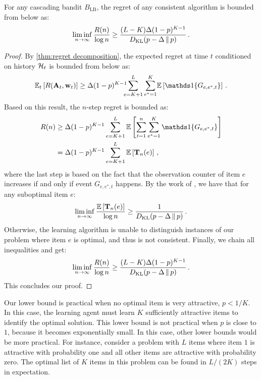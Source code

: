\begin{theorem}
\label{thm:lower bound} For any cascading bandit $B_\mathrm{LB}$, the regret of any consistent algorithm is bounded from below as:
\begin{align*}
  \liminf_{n \to \infty} \frac{R(n)}{\log n} \geq
  \frac{(L - K) \Delta (1 - p)^{K - 1}}{D_\mathrm{KL}(p - \Delta \,\|\, p)}\,.
\end{align*}
\end{theorem}
\begin{proof}
By \cref{thm:regret decomposition}, the expected regret at time $t$ conditioned on history $\mathcal{H}_t$ is bounded from below as:
\begin{align*}
  \EEt{R(\rnd{A}_t, \rnd{w}_t)} \geq
  \Delta (1 - p)^{K - 1} \!\!\!\! \sum_{e = K + 1}^L \sum_{e^\ast = 1}^K \! \EE{\I{G_{e, e^\ast, t}}}\,.
\end{align*}
Based on this result, the $n$-step regret is bounded as:
\begin{align*}
  R(n)
  & \geq \Delta (1 - p)^{K - 1} \sum_{e = K + 1}^L
  \EE{\sum_{t = 1}^n \sum_{e^\ast = 1}^K \I{G_{e, e^\ast, t}}} \\
  & = \Delta (1 - p)^{K - 1} \sum_{e = K + 1}^L \EE{\rnd{T}_n(e)}\,,
\end{align*}
where the last step is based on the fact that the observation counter of item $e$ increases if and only if event $G_{e, e^\ast, t}$ happens. By the work of \citet{lai85asymptotically}, we have that for any suboptimal item $e$:
\begin{align*}
  \liminf_{n \to \infty} \frac{\mathbb{E} \left[\mathbf{T}_n(e)\right]}{\log n} \geq \frac{1}{D_\mathrm{KL}(p - \Delta \,\|\, p)}\,.
\end{align*}
Otherwise, the learning algorithm is unable to distinguish instances of our problem where item $e$ is optimal, and thus is not consistent. Finally, we chain all inequalities and get:
\begin{align*}
  \liminf_{n \to \infty} \frac{R(n)}{\log n} \geq
  \frac{(L - K) \Delta (1 - p)^{K - 1}}{D_\mathrm{KL}(p - \Delta \,\|\, p)}\,.
\end{align*}
This concludes our proof.
\end{proof}

Our lower bound is practical when no optimal item is very attractive, $p < 1 / K$. In this case, the learning agent must learn $K$ sufficiently attractive items to identify the optimal solution. This lower bound is not practical when $p$ is close to $1$, because it becomes exponentially small. In this case, other lower bounds would be more practical. For instance, consider a problem with $L$ items where item $1$ is attractive with probability one and all other items are attractive with probability zero. The optimal list of $K$ items in this problem can be found in $L / (2 K)$ steps in expectation.
